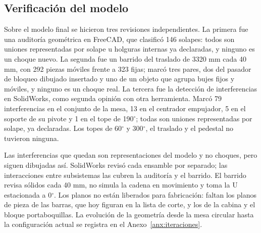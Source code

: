 \subsection*{Verificación del modelo}

Sobre el modelo final se hicieron tres revisiones independientes. La primera fue una auditoría geométrica en FreeCAD, que clasificó 146 solapes: todos son uniones representadas por solape u holguras internas ya declaradas, y ninguno es un choque nuevo. La segunda fue un barrido del traslado de 3320 mm cada 40 mm, con 292 piezas móviles frente a 323 fijas; marcó tres pares, dos del pasador de bloqueo dibujado insertado y uno de un objeto que agrupa bujes fijos y móviles, y ninguno es un choque real. La tercera fue la detección de interferencias en SolidWorks, como segunda opinión con otra herramienta. Marcó 79 interferencias en el conjunto de la mesa, 13 en el centrador empujador, 5 en el soporte de su pivote y 1 en el tope de 190$^\circ$; todas son uniones representadas por solape, ya declaradas. Los topes de 60$^\circ$ y 300$^\circ$, el traslado y el pedestal no tuvieron ninguna.

Las interferencias que quedan son representaciones del modelo y no choques, pero siguen dibujadas así. SolidWorks revisó cada ensamble por separado; las interacciones entre subsistemas las cubren la auditoría y el barrido. El barrido revisa sólidos cada 40 mm, no simula la cadena en movimiento y toma la U estacionada a 0$^\circ$. Los planos no están liberados para fabricación: faltan los planos de pieza de las barras, que hoy figuran en la lista de corte, y los de la cabina y el bloque portaboquillas. La evolución de la geometría desde la mesa circular hasta la configuración actual se registra en el Anexo~\ref{anx:iteraciones}.
